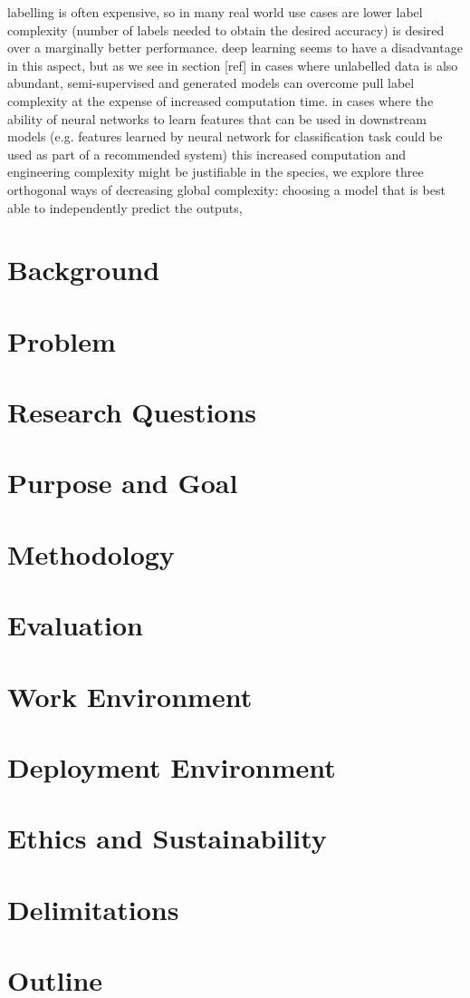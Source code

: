 labelling is often expensive, so in many real world use cases are lower label complexity (number of labels needed to obtain the desired accuracy) is desired over a marginally better performance.
deep learning seems to have a disadvantage in this aspect, but as we see in section [ref] in cases where unlabelled data is also abundant, semi-supervised and generated models can overcome pull label complexity at the expense of increased computation time.
in cases where the ability of neural networks to learn features that can be used in downstream models (e.g. features learned by neural network for classification task could be used as part of a recommended system) this increased computation and engineering complexity might be justifiable
in the species, we explore three orthogonal ways of decreasing global complexity: choosing a model that is best able to independently predict the outputs,

\section{Background}
\section{Problem}
\section{Research Questions}
\section{Purpose and Goal}
\section{Methodology}
\section{Evaluation}
\section{Work Environment}
\section{Deployment Environment}
\section{Ethics and Sustainability}
\section{Delimitations}
\section{Outline}
